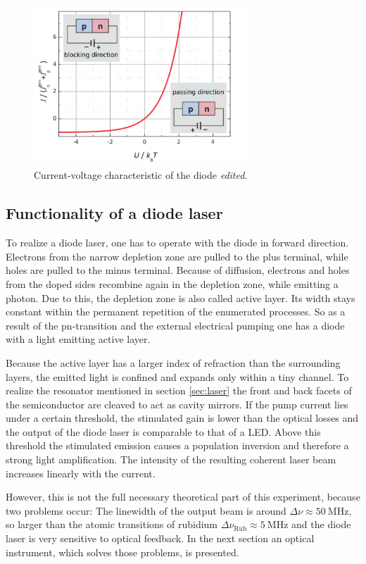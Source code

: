 \begin{figure}
  \centering
  \includegraphics[height=6cm]{Ordnername/currvolt_edit.pdf}
  \caption{Current-voltage characteristic of the diode \cite{semiconductors} \textit{edited}.}
  \label{fig:currvolt}
\end{figure}

\subsection{Functionality of a diode laser}

To realize a diode laser, one has to operate with the diode in forward direction.
Electrons from the narrow depletion zone are pulled to the plus terminal, while
holes are pulled to the minus terminal. Because of diffusion, electrons and holes from the doped sides
recombine again in the depletion zone, while emitting a photon. Due to this, the depletion zone is
also called active layer. Its width stays constant within the permanent repetition of the enumerated
processes. So as a result of the pn-transition and the external electrical pumping one has a diode
with a light emitting active layer.

Because the active layer has a larger index of refraction than the surrounding layers, the emitted light is confined
and expands only within a tiny channel. To realize the resonator mentioned in section \ref{sec:laser} the front
and back facets of the semiconductor are cleaved to act as cavity mirrors. If the pump current lies under a
certain threshold, the stimulated gain is lower than the optical losses and the output of the diode laser is
comparable to that of a LED. Above this threshold the stimulated emission causes a population inversion and therefore
a strong light amplification. The intensity of the resulting coherent laser beam increases linearly with the current.

However, this is not the full necessary theoretical part of this experiment, because two problems occur:
The linewidth of the output beam is around $\Delta \nu \approx \SI{50}{\mega\hertz}$, so larger than the atomic transitions
of rubidium $\Delta \nu_\text{Rub} \approx \SI{5}{\mega\hertz}$ and the diode laser is very sensitive to optical feedback.
In the next section an optical instrument, which solves those problems, is presented.


